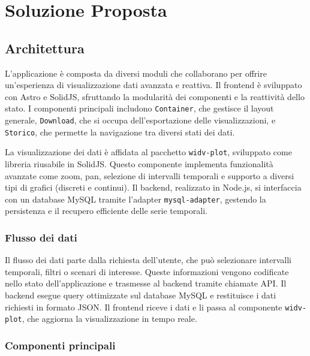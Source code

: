 \clearpage{\pagestyle{empty}\cleardoublepage}
\chapter{Soluzione Proposta}
\label{chap:soluzione_proposta}
\cite{astro}
\cite{solidjs}
\cite{d3js}
\cite{tailwindcss}
\cite{nodejs}
\cite{mysql}
\cite{docker}
\cite{grafana}
\cite{kibana}
\section{Architettura}

L'applicazione è composta da diversi moduli che collaborano per offrire un'esperienza di visualizzazione dati avanzata e reattiva. Il frontend è sviluppato con Astro e SolidJS, sfruttando la modularità dei componenti e la reattività dello stato. I componenti principali includono \texttt{Container}, che gestisce il layout generale, \texttt{Download}, che si occupa dell'esportazione delle visualizzazioni, e \texttt{Storico}, che permette la navigazione tra diversi stati dei dati. 

La visualizzazione dei dati è affidata al pacchetto \texttt{widv-plot}, sviluppato come libreria riusabile in SolidJS. Questo componente implementa funzionalità avanzate come zoom, pan, selezione di intervalli temporali e supporto a diversi tipi di grafici (discreti e continui). Il backend, realizzato in Node.js, si interfaccia con un database MySQL tramite l'adapter \texttt{mysql-adapter}, gestendo la persistenza e il recupero efficiente delle serie temporali.

\subsection{Flusso dei dati}

Il flusso dei dati parte dalla richiesta dell'utente, che può selezionare intervalli temporali, filtri o scenari di interesse. Queste informazioni vengono codificate nello stato dell'applicazione e trasmesse al backend tramite chiamate API. Il backend esegue query ottimizzate sul database MySQL e restituisce i dati richiesti in formato JSON. Il frontend riceve i dati e li passa al componente \texttt{widv-plot}, che aggiorna la visualizzazione in tempo reale.

\subsection{Componenti principali}

